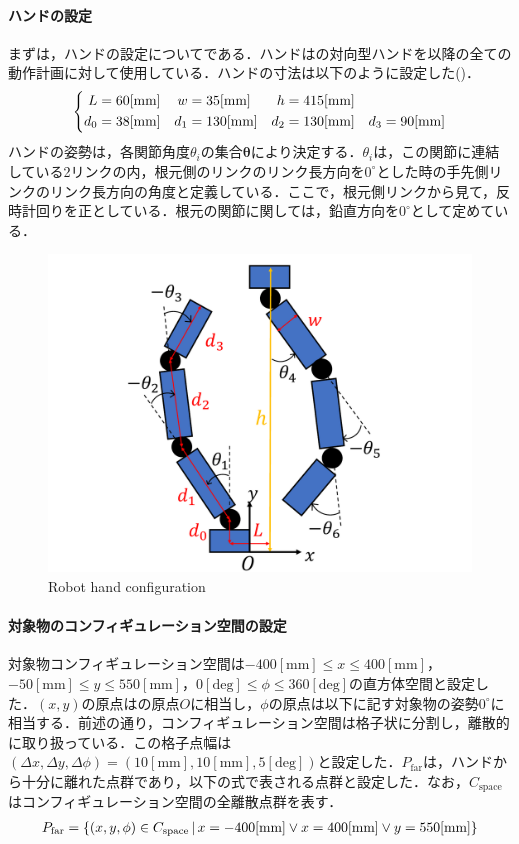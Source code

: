 \documentclass[a4paper,twoside,12pt,papersize, dvipdfmx]{iirthesis}
\begin{document}
\paragraph{ハンドの設定}
まずは，ハンドの設定についてである．ハンドはの対向型ハンドを以降の全ての動作計画に対して使用している．ハンドの寸法は以下のように設定した()．
\begin{gather}
\notag
\left\{
\begin{aligned}
L &= 60 \mathrm{[mm]} & w& = 35 \mathrm{[mm]} & h &= 415 \mathrm{[mm]}\\
d_0 &= 38 \mathrm{[mm]} & d_1 &= 130 \mathrm{[mm]} & d_2 &= 130 \mathrm{[mm]} & d_3 = 90 \mathrm{[mm]}
\end{aligned}
\right .
\end{gather}
ハンドの姿勢は，各関節角度$\theta_i$の集合$\bm {\theta}$により決定する．$\theta_i$は，この関節に連結している2リンクの内，根元側のリンクのリンク長方向を$0^\circ$とした時の手先側リンクのリンク長方向の角度と定義している．ここで，根元側リンクから見て，反時計回りを正としている．根元の関節に関しては，鉛直方向を$0^\circ$として定めている．
\begin{figure}[b]
\centering
\includegraphics[width=0.7\hsize]{fig/3-new-planner/handsize.pdf}
\caption{Robot hand configuration}\label{fig::planner::handsize}
\end{figure}

\paragraph{対象物のコンフィギュレーション空間の設定}
対象物コンフィギュレーション空間は$-400 \mathrm{[mm]} \leq x \leq 400 \mathrm{[mm]}$，$-50 \mathrm{[mm]} \leq y \leq 550 \mathrm{[mm]}$，$0 \mathrm{[deg]} \leq \phi \leq 360 \mathrm{[deg]}$の直方体空間と設定した．$(x,y)$の原点はの原点$O$に相当し，$\phi$の原点は以下に記す対象物の姿勢$0^\circ$に相当する．前述の通り，コンフィギュレーション空間は格子状に分割し，離散的に取り扱っている．この格子点幅は$(\Delta x, \Delta y, \Delta \phi) = (10 \mathrm{[mm]}, 10 \mathrm{[mm]}, 5 \mathrm{[deg]})$と設定した．$P_{\mathrm {far}}$は，ハンドから十分に離れた点群であり，以下の式で表される点群と設定した．なお，$C_{\mathrm {space}}$はコンフィギュレーション空間の全離散点群を表す．
\begin{gather}
\notag
P_{\mathrm {far}} = \{ (x, y, \phi) \in C_{\mathrm {space}} \,|\, x = -400 \mathrm{[mm]} \lor x = 400 \mathrm{[mm]} \lor y = 550\mathrm{[mm]} \}
\end{gather}
\end{document}
